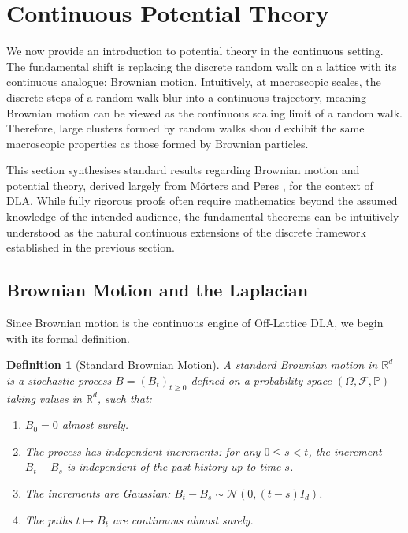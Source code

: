 \documentclass[12pt, a4paper, oneside]{report}
\newtheorem{definition}[theorem]{Definition}
\theoremstyle{remark}
\begin{document}
\section[Continuous Potential Theory]{Continuous Potential Theory}
\label{sec:continuous_theory}
We now provide an introduction to potential theory in the continuous setting. The fundamental shift is replacing the discrete random walk on a lattice with its continuous analogue: Brownian motion. Intuitively, at macroscopic scales, the discrete steps of a random walk blur into a continuous trajectory, meaning Brownian motion can be viewed as the continuous scaling limit of a random walk. Therefore, large clusters formed by random walks should exhibit the same macroscopic properties as those formed by Brownian particles.

This section synthesises standard results regarding Brownian motion and potential theory, derived largely from M{\"o}rters and Peres \cite{Morters2010}, for the context of DLA. While fully rigorous proofs often require mathematics beyond the assumed knowledge of the intended audience, the fundamental theorems can be intuitively understood as the natural continuous extensions of the discrete framework established in the previous section.


\subsection{Brownian Motion and the Laplacian}

Since Brownian motion is the continuous engine of Off-Lattice DLA, we begin with its formal definition.

\begin{definition}[Standard Brownian Motion]
A standard Brownian motion in $\mathbb{R}^d$ is a stochastic process $B = (B_t)_{t \ge 0}$ defined on a probability space $(\Omega, \mathcal{F}, \mathbb{P})$ taking values in $\mathbb{R}^d$, such that:
\begin{enumerate}
    \item $B_0 = 0$ almost surely.
    \item The process has independent increments: for any $0 \le s < t$, the increment $B_t - B_s$ is independent of the past history up to time $s$.
    \item The increments are Gaussian: $B_t - B_s \sim \mathcal{N}(0, (t-s)I_d)$.
    \item The paths $t \mapsto B_t$ are continuous almost surely.
\end{enumerate}
\end{definition}
\end{document}
